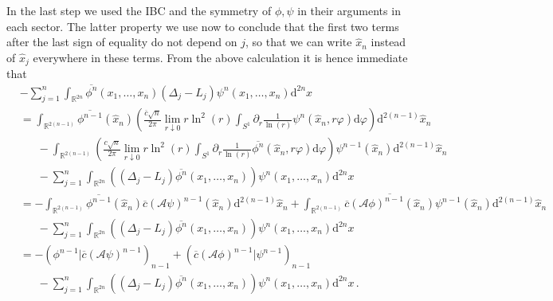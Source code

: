 In the last step we used the IBC and the symmetry of $\phi,\psi$ in their arguments in each sector. The latter property we use now to conclude that the first two terms after the last sign of equality do not depend on $j$, so that we can write $\hat{x}_{n}$ instead of $\hat{x}_{j}$ everywhere in these terms. From the above calculation it is hence immediate that
\begin{align*}
  &
  -
  \sum_{j = 1}^{n}
  \int_{\mathbb{R}^{2n}}
  \overline{\phi^{n}}
  \left(
    x_{1}
    ,
    \dots
    ,
    x_{n}
  \right)
  (\Delta_{j} - L_{j})
  \psi^{n}
  \left(
    x_{1}
    ,
    \dots
    ,
    x_{n}
  \right)
  \mathrm{d}^{2n}x
  \\
  &=
  \int_{\mathbb{R}^{2(n-1)}}
  \overline{\phi^{n-1}}(\hat{x}_{n})
  \left(
    \frac{\overline{c}\sqrt{n}}{2\pi}
    \lim_{r \downarrow 0}
    r
    \ln^{2}(r)
    \int_{S^{1}}
    \partial_{r}
    \frac{1}{\ln(r)}
    \psi^{n}(\hat{x}_{n},r\varphi)
    \mathrm{d}\varphi
  \right)
  \mathrm{d}^{2(n-1)}\hat{x}_{n}
  \\
  &\phantom{=\ }
  -
  \int_{\mathbb{R}^{2(n-1)}}
  \left(
    \frac{c\sqrt{n}}{2\pi}
    \lim_{r \downarrow 0}
    r
    \ln^{2}(r)
    \int_{S^{1}}
    \partial_{r}
    \frac{1}{\ln(r)}
    \overline{\phi^{n}}(\hat{x}_{n},r\varphi)
    \mathrm{d}\varphi
  \right)
  \psi^{n-1}(\hat{x}_{n})
  \mathrm{d}^{2(n-1)}\hat{x}_{n}
  \\
  &\phantom{=\ }
  -
  \sum_{j = 1}^{n}
  \int_{\mathbb{R}^{2n}}
  \left(
    (\Delta_{j} - L_{j})
    \overline{\phi^{n}}
    \left(
      x_{1}
      ,
      \dots
      ,
      x_{n}
    \right)
  \right)
  \psi^{n}(x_{1},\dots,x_{n})
  \mathrm{d}^{2n}x
  \\
  &=
  -
  \int_{\mathbb{R}^{2(n-1)}}
  \overline{\phi^{n-1}}(\hat{x}_{n})
  \overline{c}
  \left(
    \mathcal{A}
    \psi
  \right)^{n - 1}
  (\hat{x}_{n})
  \mathrm{d}^{2(n-1)}\hat{x}_{n}
  +
  \int_{\mathbb{R}^{2(n-1)}}
  \overline{
  \overline{c}
  \left(
    \mathcal{A}
    \phi
  \right)^{n - 1}
  (\hat{x}_{n})
  }
  \psi^{n-1}(\hat{x}_{n})
  \mathrm{d}^{2(n-1)}\hat{x}_{n}
  \\
  &\phantom{=\ }
  -
  \sum_{j = 1}^{n}
  \int_{\mathbb{R}^{2n}}
  \left(
    (\Delta_{j} - L_{j})
    \overline{\phi^{n}}
    \left(
      x_{1}
      ,
      \dots
      ,
      x_{n}
    \right)
  \right)
  \psi^{n}
  \left(
    x_{1}
    ,
    \dots
    ,
    x_{n}
  \right)
  \mathrm{d}^{2n}x
  \\
  &=
  -
  \left(
      \phi^{n-1}
    \big\vert
      \overline{c}
      \left(
        \mathcal{A}
        \psi
      \right)^{n - 1}
  \right)_{n - 1}
  +
  \left(
      \overline{c}
      \left(
        \mathcal{A}
        \phi
      \right)^{n - 1}
    \big\vert
      \psi^{n - 1}
  \right)_{n - 1}
  \\
  &\phantom{=\ }
  -
  \sum_{j = 1}^{n}
  \int_{\mathbb{R}^{2n}}
  \left(
    (\Delta_{j} - L_{j})
    \overline{\phi^{n}}
    \left(
      x_{1}
      ,
      \dots
      ,
      x_{n}
    \right)
  \right)
  \psi^{n}
  \left(
    x_{1}
    ,
    \dots
    ,
    x_{n}
  \right)
  \mathrm{d}^{2n}x
  \,.
\end{align*}
